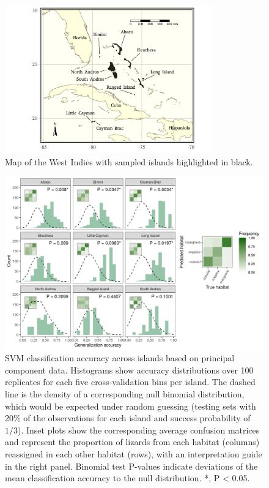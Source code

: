 \begin{figure}[H]
    \centering
	\includegraphics[width=0.8\textwidth]{figures/map.pdf}
	\caption{Map of the West Indies with sampled islands highlighted in black.}
	\label{fig:map}
\end{figure}

\begin{figure}[H]
	\centering
	\includegraphics[width=\textwidth]{figures/classif_svm_pca.png}
	\caption{SVM classification accuracy across islands based on principal component data. Histograms show accuracy distributions over 100 replicates for each five cross-validation bins per island. The dashed line is the density of a corresponding null binomial distribution, which would be expected under random guessing (testing sets with 20\% of the observations for each island and success probability of $1/3$). Inset plots show the corresponding average confusion matrices and represent the proportion of lizards from each habitat (columns) reassigned in each other habitat (rows), with an interpretation guide in the right panel. Binomial test P-values indicate deviations of the mean classification accuracy to the null distribution. *, P < 0.05.}
	\label{fig:classif-svm-pca}
\end{figure}


